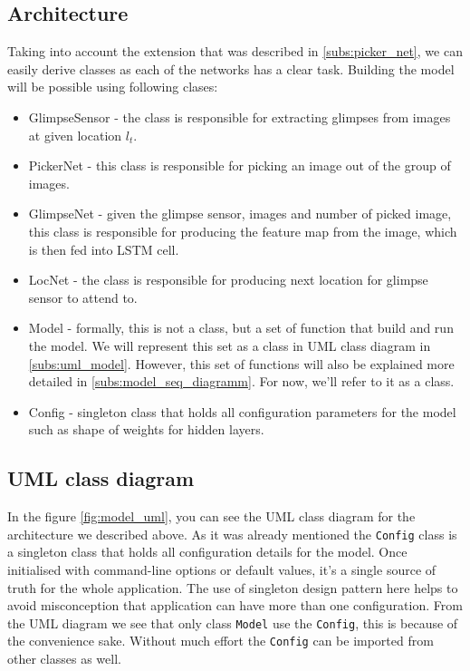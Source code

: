 \subsection{Architecture} \label{subs:arch_model} Taking into account
the extension that was
described in \autoref{subs:picker_net}, we can easily derive classes
as each of the networks has a clear task. Building the model will be
possible using following clases:

\begin{itemize}
	\item GlimpseSensor - the class is responsible for extracting glimpses from
		images at given location $l_t$.
	\item PickerNet - this class is responsible for picking an image out of the
		group of images.
	\item GlimpseNet - given the glimpse sensor, images and number of picked image,
		this class is responsible for producing the feature map from the image,
		which is then fed into LSTM cell.
	\item LocNet - the class is responsible for producing next location for
	glimpse sensor to attend to.
	\item Model - formally, this is not a class, but a set of function that build
		and run the model. We will represent this set as a class in UML class diagram
		in \autoref{subs:uml_model}. However, this set of functions will also be explained
		more detailed in \autoref{subs:model_seq_diagramm}.
		For now, we'll refer to it as a class.
	\item Config - singleton class that holds all
		configuration parameters for the model such as shape of weights
		for hidden layers.
\end{itemize}


\subsection{UML class diagram}
\label{subs:uml_model}

In the figure \ref{fig:model_uml}, you can see the UML class diagram for the
architecture we described above. As it was already mentioned the \lstinline{Config}
class is a singleton class that holds all configuration details for the model.
Once initialised with command-line options or default values, it's a single source
of truth for the whole application. The use of singleton design pattern here helps
to avoid misconception that application can have more than one configuration.
From the UML diagram we see that only class \lstinline{Model} use the
\lstinline{Config}, this is because of the convenience sake. Without much effort the
\lstinline{Config} can be imported from other classes as well.

